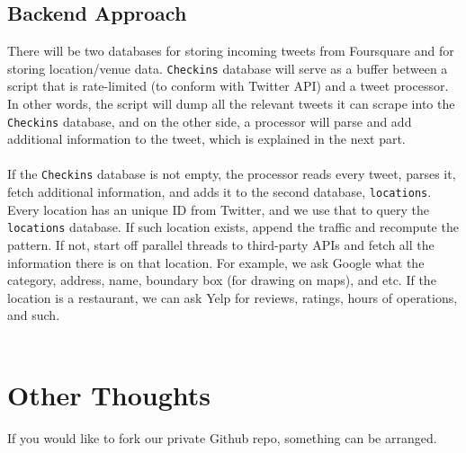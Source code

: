 \documentclass{article}
\begin{document}
\subsection{Backend Approach}
There will be two databases for storing incoming tweets from Foursquare and for storing
location/venue data. \verb|Checkins| database will serve as a buffer between a script that is rate-limited
(to conform with Twitter API) and a tweet processor. In other words, the script will dump all the relevant 
tweets it can scrape into the \verb|Checkins| database, and on the other side, a processor will parse and
add additional information to the tweet, which is explained in the next part. \\ \\
If the \verb|Checkins| database is not empty, the processor reads every tweet, parses it, fetch
additional information, and adds it to the second database, \verb|locations|. Every location has an
unique ID from Twitter, and we use that to query the \verb|locations| database. If such location
exists, append the traffic and recompute the pattern. If not, start off parallel threads to
third-party APIs and fetch all the information there is on that location. For example, we ask Google
what the category, address, name, boundary box (for drawing on maps), and etc. If the location is a
restaurant, we can ask Yelp for reviews, ratings, hours of operations, and such. \\ \\

\section{Other Thoughts}
If you would like to fork our private Github repo, something can be arranged.
\end{document}
